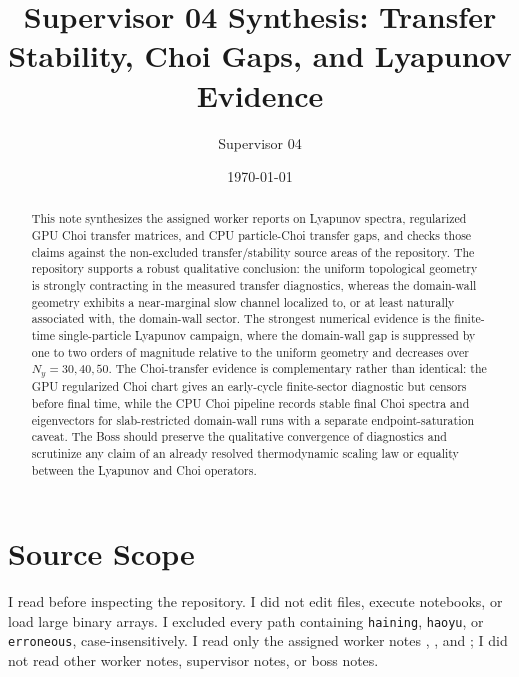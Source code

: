 \documentclass[aps,prb,onecolumn,nofootinbib,superscriptaddress]{revtex4-2}
\begin{document}
\title{Supervisor 04 Synthesis: Transfer Stability, Choi Gaps, and Lyapunov Evidence}
\author{Supervisor 04}
\date{\today}

\begin{abstract}
This note synthesizes the assigned worker reports on Lyapunov spectra,
regularized GPU Choi transfer matrices, and CPU particle-Choi transfer gaps,
and checks those claims against the non-excluded transfer/stability source
areas of the repository.  The repository supports a robust qualitative
conclusion: the uniform topological geometry is strongly contracting in the
measured transfer diagnostics, whereas the domain-wall geometry exhibits a
near-marginal slow channel localized to, or at least naturally associated with,
the domain-wall sector.  The strongest numerical evidence is the finite-time
single-particle Lyapunov campaign, where the domain-wall gap is suppressed by
one to two orders of magnitude relative to the uniform geometry and decreases
over \(N_y=30,40,50\).  The Choi-transfer evidence is complementary rather
than identical: the GPU regularized Choi chart gives an early-cycle finite-sector
diagnostic but censors before final time, while the CPU Choi pipeline records
stable final Choi spectra and eigenvectors for slab-restricted domain-wall runs
with a separate endpoint-saturation caveat.  The Boss should preserve the
qualitative convergence of diagnostics and scrutinize any claim of an already
resolved thermodynamic scaling law or equality between the Lyapunov and Choi
operators.
\end{abstract}

\maketitle
\setcounter{tocdepth}{2}
\tableofcontents

\section{Source Scope}

I read  before inspecting the repository.  I did not edit
files, execute notebooks, or load large binary arrays.  I excluded every path
containing \texttt{haining}, \texttt{haoyu}, or \texttt{erroneous},
case-insensitively.  I read only the assigned worker notes
,
,
and
;
I did not read other worker notes, supervisor notes, or boss notes.
\end{document}

